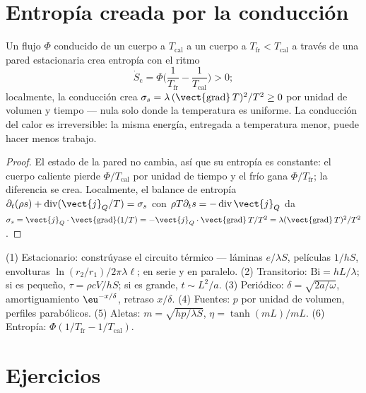 \section{Entropía creada por la conducción}

\begin{proposition}\label{prop:b2:heat-conduction:entropy}
Un flujo $\Phi$ conducido de un cuerpo a $T_{\text{cal}}$ a un cuerpo a
$T_{\text{fr}} < T_{\text{cal}}$ a través de una pared estacionaria crea entropía con
el ritmo
\[
\dot S_{\text{c}} = \Phi\Big(\frac{1}{T_{\text{fr}}} - \frac{1}{T_{\text{cal}}}\Big) > 0 ;
\]
localmente, la conducción crea $\sigma_s = \lambda\,(\vect{\operatorname{grad}}\,T)^2/T^2
\ge 0$ por unidad de volumen y tiempo --- nula solo donde la temperatura es
uniforme. La conducción del calor es irreversible: la misma energía, entregada a
temperatura menor, puede hacer menos trabajo.
\end{proposition}

\begin{proof}
El estado de la pared no cambia, así que su entropía es constante: el cuerpo
caliente pierde $\Phi/T_{\text{cal}}$ por unidad de tiempo y el frío gana
$\Phi/T_{\text{fr}}$; la diferencia se crea. Localmente, el balance de entropía
$\partial_t(\rho s) + \operatorname{div}(\vect{j}_Q/T) = \sigma_s$
con $\rho T\partial_t s = -\operatorname{div}\vect{j}_Q$ da $\sigma_s =
\vect{j}_Q\cdot\vect{\operatorname{grad}}(1/T) = -\vect{j}_Q\cdot
\vect{\operatorname{grad}}\,T/T^2 = \lambda(\vect{\operatorname{grad}}\,T)^2/T^2$.
\end{proof}

\begin{method}\label{meth:b2:heat-conduction:method}
(1) Estacionario: constrúyase el circuito térmico --- láminas $e/\lambda S$, películas
$1/hS$, envolturas $\ln(r_2/r_1)/2\pi\lambda\ell$; en serie y en paralelo.
(2) Transitorio: $\mathrm{Bi} = hL/\lambda$; si es pequeño, $\tau = \rho cV/hS$; si es
grande, $t \sim L^2/a$. (3) Periódico: $\delta = \sqrt{2a/\omega}$, amortiguamiento
$\eu^{-x/\delta}$, retraso $x/\delta$. (4) Fuentes: $p$ por unidad de volumen, perfiles
parabólicos. (5) Aletas: $m = \sqrt{hp/\lambda S}$, $\eta = \tanh(mL)/mL$. (6)
Entropía: $\Phi(1/T_{\text{fr}} - 1/T_{\text{cal}})$.
\end{method}

\section{Ejercicios}

